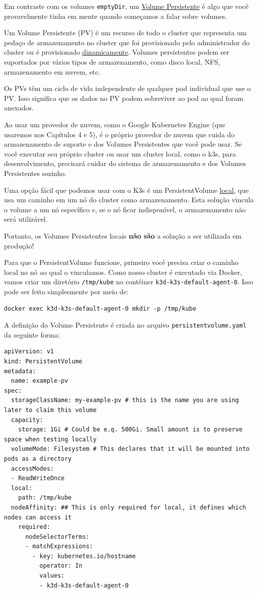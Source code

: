 \documentclass[11pt,a4paper]{article}
\begin{document}
Em contraste com os volumes \texttt{emptyDir}, um \href{https://kubernetes.io/docs/concepts/storage/persistent-volumes/}{Volume Persistente} é algo que você provavelmente tinha em mente quando começamos a falar sobre volumes.

Um Volume Persistente (PV) é um recurso de todo o cluster que representa um pedaço de armazenamento no cluster que foi provisionado pelo administrador do cluster ou é provisionado \href{https://kubernetes.io/docs/concepts/storage/dynamic-provisioning/}{dinamicamente}. Volumes persistentes podem ser suportados por vários tipos de armazenamento, como disco local, NFS, armazenamento em nuvem, etc.

Os PVs têm um ciclo de vida independente de qualquer pod individual que use o PV. Isso significa que os dados no PV podem sobreviver ao pod ao qual foram anexados.

Ao usar um provedor de nuvem, como o Google Kubernetes Engine (que usaremos nos Capítulos 4 e 5), é o próprio provedor de nuvem que cuida do armazenamento de suporte e dos Volumes Persistentes que você pode usar. Se você executar seu próprio cluster ou usar um cluster local, como o k3s, para desenvolvimento, precisará cuidar do sistema de armazenamento e dos Volumes Persistentes sozinho.

Uma opção fácil que podemos usar com o K3s é um PersistentVolume \href{https://kubernetes.io/docs/concepts/storage/volumes/#local}{local}, que usa um caminho em um nó do cluster como armazenamento. Esta solução vincula o volume a um nó específico e, se o nó ficar indisponível, o armazenamento não será utilizável.

Portanto, os Volumes Persistentes locais \textbf{não são} a solução a ser utilizada em produção!

Para que o PersistentVolume funcione, primeiro você precisa criar o caminho local no nó ao qual o vinculamos. Como nosso cluster é executado via Docker, vamos criar um diretório \texttt{/tmp/kube} no contêiner \texttt{k3d-k3s-default-agent-0}. Isso pode ser feito simplesmente por meio de:

\begin{verbatim}
docker exec k3d-k3s-default-agent-0 mkdir -p /tmp/kube
\end{verbatim}

A definição do Volume Persistente é criada no arquivo \texttt{persistentvolume.yaml} da seguinte forma:

\begin{verbatim}
apiVersion: v1
kind: PersistentVolume
metadata:
  name: example-pv
spec:
  storageClassName: my-example-pv # this is the name you are using later to claim this volume
  capacity:
    storage: 1Gi # Could be e.q. 500Gi. Small amount is to preserve space when testing locally
  volumeMode: Filesystem # This declares that it will be mounted into pods as a directory
  accessModes:
  - ReadWriteOnce
  local:
    path: /tmp/kube
  nodeAffinity: ## This is only required for local, it defines which nodes can access it
    required:
      nodeSelectorTerms:
      - matchExpressions:
        - key: kubernetes.io/hostname
          operator: In
          values:
          - k3d-k3s-default-agent-0
\end{verbatim}
\end{document}
